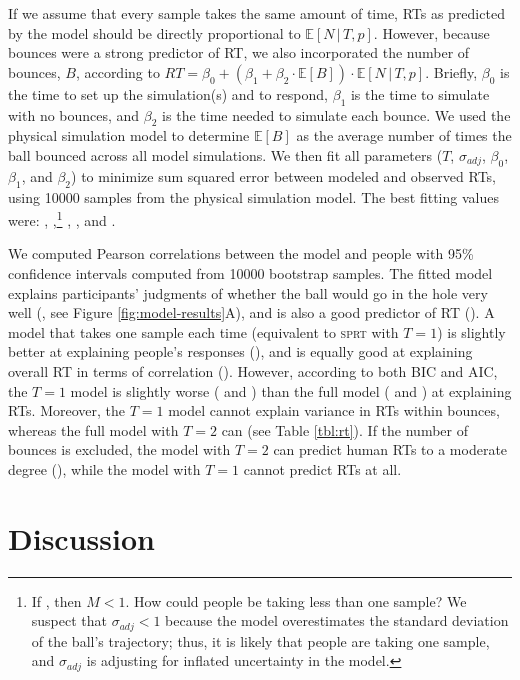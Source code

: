 \documentclass[10pt,letterpaper]{article}
\begin{document}
If we assume that every sample takes the same amount of time, RTs as predicted by the model should be directly proportional to $\mathbb{E}[N\,|\,T,p]$.
However, because bounces were a strong predictor of RT, we also incorporated the number of bounces, $B$, according to $RT = \beta_0 + (\beta_1 + \beta_2\cdot{}\mathbb{E}[B]) \cdot{}\mathbb{E}[N\,|\,T,p]$.
Briefly, $\beta_0$ is the time to set up the simulation(s) and to respond, $\beta_1$ is the time to simulate with no bounces, and $\beta_2$ is the time needed to simulate each bounce.
We used the physical simulation model to determine $\mathbb{E}[B]$ as the average number of times the ball bounced across all model simulations.
We then fit all parameters ($T$, $\sigma_{adj}$, $\beta_0$, $\beta_1$, and $\beta_2$) to minimize sum squared error between modeled and observed RTs, using 10000 samples from the physical simulation model.
The best fitting values were: \threshold{}, \sdadj{},\footnote{If \sdadj{}, then $M<1$. How could people be taking less than one sample?
We suspect that $\sigma_{adj}<1$ because the model overestimates the standard deviation of the ball's trajectory; thus, it is likely that people are taking one sample, and $\sigma_{adj}$ is adjusting for inflated uncertainty in the model.} \betazero{}, \betaone{}, and \betatwo{}.

We computed Pearson correlations between the model and people with 95\% confidence intervals computed from 10000 bootstrap samples.
The fitted model explains participants' judgments of whether the ball would go in the hole very well (\HoleResponseCorr{}, see Figure \ref{fig:model-results}A), and is also a good predictor of RT (\HoleRTCorr{}).
A model that takes one sample each time (equivalent to \textsc{sprt} with $T=1$) is slightly better at explaining people's responses (\RawHoleResponseCorr{}), and is equally good at explaining overall RT in terms of correlation (\NoSamplesHoleRTCorr{}).
However, according to both BIC and AIC, the $T=1$ model is slightly worse (\BicNoSamples{} and \AicNoSamples{}) than the full model (\BicFull{} and \AicFull{}) at explaining RTs.
Moreover, the $T=1$ model cannot explain variance in RTs within bounces, whereas the full model with $T=2$ can (see Table \ref{tbl:rt}).
If the number of bounces is excluded, the model with $T=2$ can predict human RTs to a moderate degree (\NoBouncesHoleRTCorr{}), while the model with $T=1$ cannot predict RTs at all.

\section{Discussion}
\end{document}
